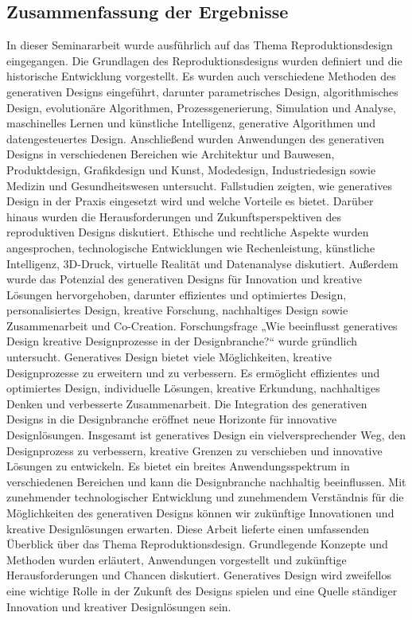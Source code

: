 \subsection*{Zusammenfassung der Ergebnisse}

In dieser Seminararbeit wurde ausführlich auf das Thema Reproduktionsdesign eingegangen. Die Grundlagen des Reproduktionsdesigns wurden definiert und die historische Entwicklung vorgestellt. Es wurden auch verschiedene Methoden des generativen Designs eingeführt, darunter parametrisches Design, algorithmisches Design, evolutionäre Algorithmen, Prozessgenerierung, Simulation und Analyse, maschinelles Lernen und künstliche Intelligenz, generative Algorithmen und datengesteuertes Design. 
  Anschließend wurden  Anwendungen des generativen Designs in verschiedenen Bereichen wie Architektur und Bauwesen, Produktdesign, Grafikdesign und Kunst, Modedesign, Industriedesign sowie Medizin und Gesundheitswesen untersucht. Fallstudien zeigten, wie generatives Design in der Praxis eingesetzt wird und welche Vorteile es bietet. Darüber hinaus wurden die Herausforderungen und Zukunftsperspektiven des reproduktiven Designs diskutiert. Ethische und rechtliche Aspekte wurden angesprochen, technologische Entwicklungen wie Rechenleistung, künstliche Intelligenz, 3D-Druck, virtuelle Realität und Datenanalyse  diskutiert. Außerdem wurde das Potenzial des generativen Designs für Innovation und kreative Lösungen hervorgehoben, darunter effizientes und optimiertes Design, personalisiertes Design, kreative Forschung, nachhaltiges Design sowie Zusammenarbeit und Co-Creation. 
  Forschungsfrage „Wie beeinflusst generatives Design kreative Designprozesse in der Designbranche?“ wurde gründlich untersucht. Generatives Design bietet viele Möglichkeiten, kreative Designprozesse zu erweitern und zu verbessern. Es ermöglicht effizientes und optimiertes Design, individuelle Lösungen, kreative Erkundung, nachhaltiges Denken und verbesserte Zusammenarbeit. Die Integration des generativen Designs in die Designbranche eröffnet neue Horizonte für innovative Designlösungen. 
 Insgesamt ist generatives Design ein vielversprechender Weg, den Designprozess zu verbessern, kreative Grenzen zu verschieben und innovative Lösungen zu entwickeln. Es bietet ein breites Anwendungsspektrum in verschiedenen Bereichen und kann die Designbranche nachhaltig  beeinflussen. Mit zunehmender technologischer Entwicklung und zunehmendem Verständnis für die Möglichkeiten des generativen Designs können wir zukünftige Innovationen und kreative Designlösungen erwarten. Diese Arbeit lieferte einen umfassenden Überblick über das Thema Reproduktionsdesign. Grundlegende Konzepte und Methoden wurden erläutert, Anwendungen vorgestellt und zukünftige Herausforderungen und Chancen diskutiert. Generatives Design wird zweifellos eine wichtige Rolle in der Zukunft des Designs spielen und eine Quelle ständiger Innovation und kreativer Designlösungen sein.
